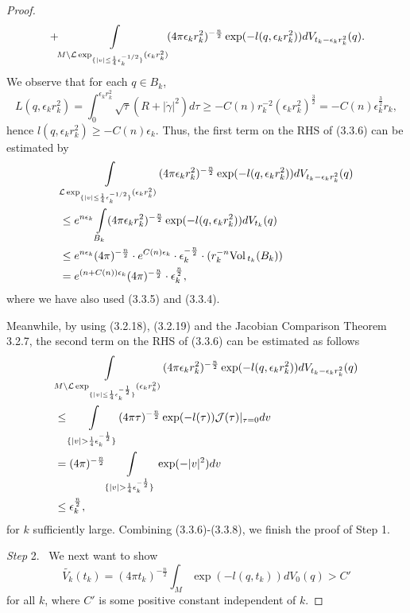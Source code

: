 \begin{proof}
\begin{align}
&\quad +\!\int\limits_{M\setminus{\mathcal{L}}
\exp_{\{|v|\leq\frac{1}{4}\epsilon_k^{-1/2}\}}(\epsilon_kr_k^2)}\!\!
(4\pi\epsilon_kr_k^2)^{-\frac{n}{2}}
\exp(-l(q,\epsilon_kr_k^2))dV_{t_k-\epsilon_kr_k^2}(q).\nonumber
\end{align}   %
We observe that for each $q\in B_k$,
$$
L(q,\epsilon_kr^2_k)
=\int_0^{\epsilon_kr_k^2}\sqrt{\tau}(R+|\dot{\gamma}|^2)d\tau
\geq-C(n)r_k^{-2}(\epsilon_kr_k^2)^{\frac{3}{2}}
=-C(n)\epsilon_k^{\frac{3}{2}}r_k,
$$
hence $l(q,\epsilon_kr^2_k)\geq -C(n)\epsilon_k.$ Thus, the first
term on the RHS of (3.3.6) can be estimated by
\begin{align}
&\int\limits_{\mathcal{L}\exp_{\{|v|\leq\frac{1}{4}
\epsilon_k^{-1/2}\}}(\epsilon_kr^2_k)}
(4\pi\epsilon_kr^2_k)^{-\frac{n}{2}}
\exp(-l(q,\epsilon_kr_k^2))dV_{t_k-\epsilon_kr^2_k}(q)\\
&\leq e^{n\epsilon_k}\int\limits_{B_k}
(4\pi\epsilon_kr^2_k)^{-\frac{n}{2}}
\exp(-l(q,\epsilon_kr_k^2))dV_{t_k}(q)\nonumber\\
&\leq e^{n\epsilon_k}(4\pi)^{-\frac{n}{2}}\cdot
e^{C(n)\epsilon_k}\cdot
\epsilon_k^{-\frac{n}{2}}\cdot(r_k^{-n}{\rm Vol}\,_{t_k}(B_k))\nonumber\\
&=e^{(n+C(n))\epsilon_k}(4\pi)^{-\frac{n}{2}}
\cdot\epsilon_k^\frac{n}{2},\nonumber
\end{align}  %
where we have also used (3.3.5) and (3.3.4).

Meanwhile, by using (3.2.18), (3.2.19) and the Jacobian Comparison
Theorem 3.2.7, the second term on the RHS of (3.3.6) can be
estimated as follows
\begin{align}
&\int\limits_{M\setminus\mathcal{L}\exp_{\{|v|\leq\frac{1}{4}
\epsilon_k^{-\frac{1}{2}}\}}(\epsilon_kr^2_k)}
(4\pi\epsilon_kr^2_k)^{-\frac{n}{2}}
\exp(-l(q,\epsilon_kr_k^2))dV_{t_k-\epsilon_kr^2_k}(q)\\
&\leq \int\limits_{\{|v|>\frac{1}{4}\epsilon_k^{-\frac{1}{2}}\}}
(4\pi\tau)^{-\frac{n}{2}}
\exp(-l(\tau))\mathcal{J}(\tau)|_{\tau=0}dv \nn\\
&=(4\pi)^{-\frac{n}{2}}\int\limits_{\{|v|>\frac{1}{4}
\epsilon_k^{-\frac{1}{2}}\}}\exp(-|v|^2)dv \nn\\
&\leq \epsilon_k^{\frac{n}{2}},\nn
\end{align} %
for $k$ sufficiently large. Combining (3.3.6)-(3.3.8), we finish
the proof of Step 1.

\medskip
{\it Step} 2. \ We next want to show
$$
\tilde{V_k}(t_k)=(4\pi
t_k)^{-\frac{n}{2}}\int_M\exp(-l(q,t_k))dV_0(q)>C'
$$
for all $k$, where $C'$ is some positive constant independent of
$k$.


\end{proof}
